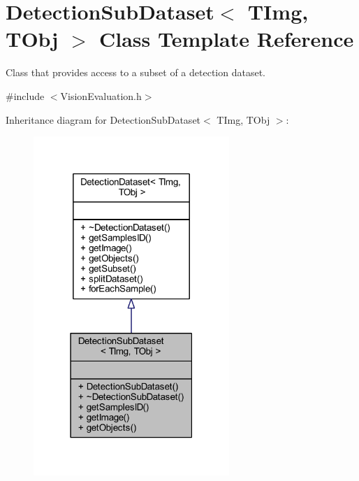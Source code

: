 \hypertarget{class_vision_core_1_1_evaluation_1_1_detection_sub_dataset}{}\section{Detection\+Sub\+Dataset$<$ T\+Img, T\+Obj $>$ Class Template Reference}
\label{class_vision_core_1_1_evaluation_1_1_detection_sub_dataset}


Class that provides access to a subset of a detection dataset.  




{\ttfamily \#include $<$Vision\+Evaluation.\+h$>$}



Inheritance diagram for Detection\+Sub\+Dataset$<$ T\+Img, T\+Obj $>$\+:
\nopagebreak
\begin{figure}[H]
\begin{center}
\leavevmode
\includegraphics[width=210pt]{class_vision_core_1_1_evaluation_1_1_detection_sub_dataset__inherit__graph}
\end{center}
\end{figure}


